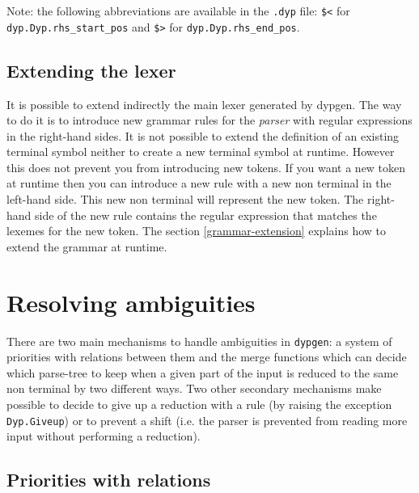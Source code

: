 \documentclass[12pt]{article}
\begin{document}
{Note: the following abbreviations are available in the \verb|.dyp| file: \verb|$<| for \verb|dyp.Dyp.rhs_start_pos| and \verb|$>| for \verb|dyp.Dyp.rhs_end_pos|.


\subsection{Extending the lexer}

It is possible to extend indirectly the main lexer generated by dypgen. The way to do it is to introduce new grammar rules for the \emph{parser} with regular expressions in the right-hand sides. It is not possible to extend the definition of an existing terminal symbol neither to create a new terminal symbol at runtime. However this does not prevent you from introducing new tokens. If you want a new token at runtime then you can introduce a new rule with a new non terminal in the left-hand side. This new non terminal will represent the new token. The right-hand side of the new rule contains the regular expression that matches the lexemes for the new token. The section \ref{grammar-extension} explains how to extend the grammar at runtime.

\section{Resolving ambiguities}\label{ambiguities}

There are two main mechanisms to handle ambiguities in \texttt{dypgen}: a system of priorities with relations between them and the merge functions which can decide which parse-tree to keep when a given part of the input is reduced to the same non terminal by two different ways. Two other secondary mechanisms make possible to decide to give up a reduction with a rule (by raising the exception \texttt{Dyp.Giveup}) or to prevent a shift (i.e. the parser is prevented from reading more input without performing a reduction).

\subsection{Priorities with relations}\label{priority}

}
\end{document}
